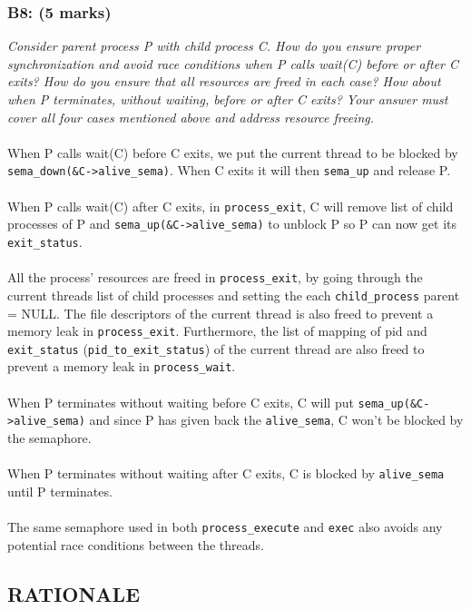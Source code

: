 \documentclass{article}
\begin{document}
\subsubsection*{B8: (5 marks) }
\textit{Consider parent process P with child process C. How do you ensure proper
synchronization and avoid race conditions when P calls wait(C) before or
after C exits? How do you ensure that all resources are freed in each case?
How about when P terminates, without waiting, before or after C exits? Your
answer must cover all four cases mentioned above and address resource freeing.}
\\ \\
When P calls wait(C) before C exits, we put the current thread to be
blocked by \texttt{sema\_down(\&C->alive\_sema)}. When C exits it will then \texttt{sema\_up}
and release P.
\\ \\
When P calls wait(C) after C exits, in \texttt{process\_exit}, C will remove list of
child processes of P and \texttt{sema\_up(\&C->alive\_sema)} to unblock P so
P can now get its \texttt{exit\_status}.
\\ \\
All the process' resources are freed in \texttt{process\_exit}, by going through
the current threads list of child processes and setting the each \texttt{child\_process}
parent = NULL.
The file descriptors of the current thread is also freed to prevent a memory leak
in \texttt{process\_exit}. Furthermore, the list of mapping of pid and \texttt{exit\_status} (\texttt{pid\_to\_exit\_status})
of the current thread are also freed to prevent a memory leak in \texttt{process\_wait}.
\\ \\
When P terminates without waiting before C exits, C will put
\texttt{sema\_up(\&C->alive\_sema)} and since P has given back the \texttt{alive\_sema},
C won't be blocked by the semaphore.
\\ \\
When P terminates without waiting after C exits, C is blocked by \texttt{alive\_sema}
until P terminates.
\\ \\
The same semaphore used in both \texttt{process\_execute} and \texttt{exec} also avoids any
potential race conditions between the threads.

\subsection{RATIONALE}
\end{document}
